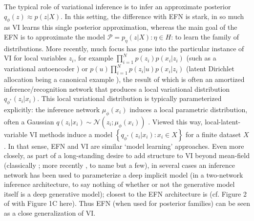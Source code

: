 \documentclass{article}
\begin{document}
The typical role of variational inference is to infer an approximate posterior $q_\phi(z) \approx p(z |X)$.  
In this setting, the difference with EFN is stark, in so much as VI learns this single posterior approximation, whereas the main goal of the EFN is to approximate the model $\mathcal{P} = p_\eta(z|X): \eta \in H$: to learn the family of distributions.  
More recently, much focus has gone into the particular instance of VI for local variables $z_i$, for example $\prod_{i=1}^N p(z_i)p(x_i | z_i)$ (such as a variational autoencoder \citep{Kingma:2013aa}) or  $p(u)\prod_{i=1}^N p(z_i|u)p(x_i | z_i)$ (latent Dirichlet allocation being a canonical example \citep{blei2003latent,blei2017variational}), the result of which is often an amortized inference/recognition network that produces a local variational distribution $q_{\phi^*}(z_i | x_i)$.  
This local variational distribution is typically parameterized explicitly: the inference network $\mu_\phi(x_i)$ induces a local parametric distribution, often a Gaussian $q(z_i | x_i) \sim \mathcal{N}\left(z_i; \mu_\phi(x_i)\right)$ \citep[for example]{Kingma:2013aa}.  Viewed this way, local-latent-variable VI methods induce a model $\left\{  q_{\phi^*}(z_i | x_i) : x_i \in X \right\}$ for a finite dataset $X$.   In that sense, EFN and VI are similar `model learning' approaches.
Even more closely, as part of a long-standing desire to add structure to VI beyond mean-field (classically \citep{saul1996exploiting, barber1999tractable}; more recently \citep{hoffman2015stochastic,tran2015copula}, to name but a few), in several cases an inference network has been used to parameterize a deep implicit model (in a two-network inference architecture, to say nothing of whether or not the generative model itself is a deep generative model); closest to the EFN architecture is \citep{rezende2015variational} (cf. Figure 2 of \citep{rezende2015variational} with Figure 1C here).   Thus EFN (when used for posterior families) can be seen as a close generalization of VI.   
\end{document}

